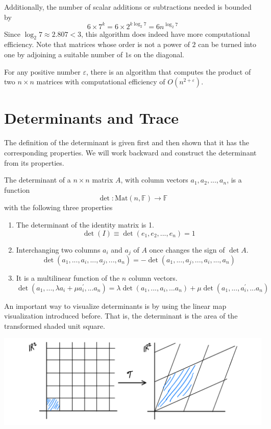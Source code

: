\documentclass{article}
\begin{document}
    Additionally, the number of scalar additions or subtractions needed is bounded by 
    \[6 \times 7^k = 6 \times 2^{k \log_2{7}} = 6 n^{\log_2{7}}\]
    Since $\log_2{7} \approx 2.807 < 3$, this algorithm does indeed have more computational efficiency. Note that matrices whose order is not a power of $2$ can be turned into one by adjoining a suitable number of $1$s on the diagonal. 

    \begin{theorem}[Conjecture]
    For any positive number $\varepsilon$, there is an algorithm that computes the product of two $n \times n$ matrices with computational efficiency of $O(n^{2 + \varepsilon})$. 
    \end{theorem}

\section{Determinants and Trace}

  The definition of the determinant is given first and then shown that it has the corresponding properties. We will work backward and construct the determinant from its properties. 

  \begin{definition}
  The determinant of a $n \times n$ matrix $A$, with column vectors $a_1, a_2, ..., a_n$, is a function
  \[\det: \text{Mat}(n, \mathbb{F}) \longrightarrow \mathbb{F}\]
  with the following three properties
  \begin{enumerate}
      \item The determinant of the identity matrix is 1. 
  \[\det{(I)} \equiv \det{(e_1, e_2, ..., e_n)} = 1\]
      \item Interchanging two columns $a_i$ and $a_j$ of $A$ once changes the sign of $\det{A}$. 
  \[\det{(a_1, ..., a_i, ..., a_j, ..., a_n)} = -\det{(a_1, ..., a_j, ..., a_i, ..., a_n)}\]
      \item It is a multilinear function of the $n$ column vectors. 
  \[\det{(a_1, ..., \lambda a_i + \mu a_i^\prime, ... a_n)} = \lambda \det{(a_1, ..., a_i, ... a_n)} + \mu \det{(a_1, ..., a_i^\prime, ... a_n)} \]
  \end{enumerate}
  \end{definition}

  An important way to visualize determinants is by using the linear map visualization introduced before. That is, the determinant is the area of the transformed shaded unit square. 
  \begin{center}
      \includegraphics[scale=0.25]{img/Determinant.PNG}
  \end{center}
\end{document}
